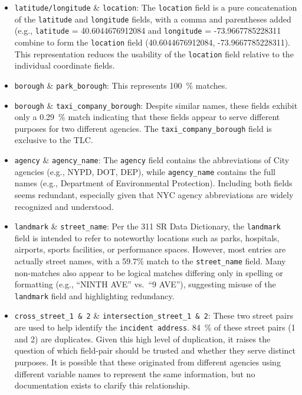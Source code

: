 \documentclass[linenumber]{jdsart}
\begin{document}
\begin{itemize}[left=1.5em, itemsep=0.25\baselineskip, align=parleft, label=\textbullet]

  \item \texttt{latitude/longitude} \& \texttt{location}:  
  The \texttt{location} field is a pure concatenation of 
  the \texttt{latitude} and \texttt{longitude} fields, with a 
  comma and parentheses added (e.g., \texttt{latitude} = 40.6044676912084 
  and \texttt{longitude} = -73.9667785228311 combine to form the \texttt{location} 
  field (40.6044676912084, -73.9667785228311). This representation reduces 
  the usability of the \texttt{location} field relative to the individual 
  coordinate fields.


  \item \texttt{borough} \& \texttt{park\_borough}:  This represents
   \SI{100}{\percent} matches.

  \item \texttt{borough} \& \texttt{taxi\_company\_borough}:  Despite 
  similar names, these fields exhibit only a \SI{0.29}{\percent} match 
  indicating that these fields appear to serve different purposes for two
  different agencies. The \texttt{taxi\_company\_borough} field is exclusive to the TLC.

  \item \texttt{agency} \& \texttt{agency\_name}:  
  The \texttt{agency} field contains the abbreviations of City 
  agencies (e.g., NYPD, DOT, DEP), while \texttt{agency\_name} 
  contains the full names (e.g., Department of Environmental Protection). 
  Including both fields seems redundant, especially given that NYC agency 
  abbreviations are widely recognized and understood.

  \item \texttt{landmark} \& \texttt{street\_name}:  
  Per the 311 SR Data Dictionary, the \texttt{landmark} field is intended 
  to refer to noteworthy locations such as parks, hospitals, airports, 
  sports facilities, or performance spaces. 
  However, most entries are actually street names, with a 59.7\% match 
  to the \texttt{street\_name} field. 
  Many non-matches also appear to be logical matches differing only 
  in spelling or formatting (e.g., ``NINTH AVE'' vs.\ ``9 AVE''), 
  suggesting misuse of the \texttt{landmark} field and highlighting redundancy.

  \item \texttt{cross\_street\_1 \& 2} \& \texttt{intersection\_street\_1 \& 2}:  
  These two street pairs are used to help identify the 
  \texttt{incident address}. \SI{84}{\percent} of these street pairs (1 and 2)
are duplicates. Given this high level of duplication, it raises the question of 
which field-pair should be trusted and whether they serve distinct 
purposes. It is possible that these originated from different agencies 
using different variable names to represent the same information, 
but no documentation exists to clarify this relationship.

\end{itemize}
\end{document}
